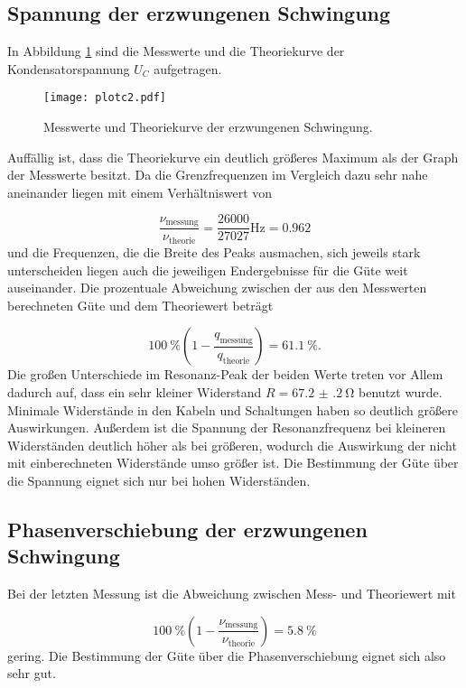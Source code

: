 \subsection{Spannung der erzwungenen Schwingung}

In Abbildung \ref{fig:Theo} sind die Messwerte und die Theoriekurve der
Kondensatorspannung $U_C$ aufgetragen.

\newpage

\begin{figure}[h]
  \centering
  \texttt{[image: plotc2.pdf]}
  \caption{Messwerte und Theoriekurve der erzwungenen Schwingung.}
  \label{fig:Theo}
\end{figure}

Auffällig ist, dass die Theoriekurve ein deutlich größeres Maximum als der
Graph der Messwerte besitzt. Da die Grenzfrequenzen im Vergleich dazu
sehr nahe aneinander liegen mit einem Verhältniswert von

\begin{equation}
  \frac{\nu_\text{messung}}{\nu_\text{theorie}} = \frac{26000}{27027}\si{\hertz}
  = 0.962
\end{equation}
und die Frequenzen, die die Breite des Peaks ausmachen, sich jeweils
stark unterscheiden liegen auch die jeweiligen Endergebnisse für die Güte
weit auseinander.
Die prozentuale Abweichung zwischen der aus den Messwerten berechneten Güte
und dem Theoriewert beträgt

\begin{equation}
  \SI{100}{\percent} (1 - \frac{q_\text{messung}}{q_\text{theorie}}) =
  \SI{61.1}{\percent}.
\end{equation}
Die großen Unterschiede im Resonanz-Peak der beiden Werte treten vor Allem
dadurch auf, dass ein sehr kleiner Widerstand $R = \SI{67.2(2)}{\ohm}$
benutzt wurde. Minimale Widerstände in den Kabeln und Schaltungen
haben so deutlich größere Auswirkungen.
Außerdem ist die Spannung der Resonanzfrequenz bei kleineren Widerständen
deutlich höher als bei größeren, wodurch die Auswirkung der nicht mit
einberechneten Widerstände umso größer ist.
Die Bestimmung der Güte über die Spannung eignet sich nur bei hohen
Widerständen.

\subsection{Phasenverschiebung der erzwungenen Schwingung}

Bei der letzten Messung ist die Abweichung zwischen Mess- und Theoriewert
mit

\begin{equation}
  \SI{100}{\percent}(1-\frac{\nu_\text{messung}}{\nu_\text{theorie}}) =
  \SI{5.8}{\percent}
\end{equation}
gering.
Die Bestimmung der Güte über die Phasenverschiebung eignet sich also sehr gut.
